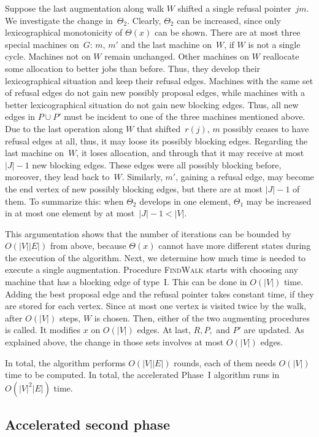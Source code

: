 \documentclass{llncs}
\begin{document}
Suppose the last augmentation along walk $W$ shifted a single refusal pointer~$jm$. We investigate the change in~$\Theta_2$. Clearly, $\Theta_2$ can be increased, since only lexicographical monotonicity of $\Theta(x)$ can be shown. There are at most three special machines on~$G$: $m$, $m'$ and the last machine on~$W$, if $W$ is not a single cycle. Machines not on $W$ remain unchanged. Other machines on $W$ reallocate some allocation to better jobs than before. Thus, they develop their lexicographical situation and keep their refusal edges. Machines with the same set of refusal edges do not gain new possibly proposal edges, while machines with a better lexicographical situation do not gain new blocking edges. Thus, all new edges in $P \cup P'$ must be incident to one of the three machines mentioned above. Due to the last operation along $W$ that shifted~$r(j)$, $m$ possibly ceases to have refusal edges at all, thus, it may loose its possibly blocking edges. Regarding the last machine on~$W$, it loses allocation, and through that it may receive at most $|J|-1$ new blocking edges. These edges were all possibly blocking before, moreover, they lead back to~$W$. Similarly, $m'$, gaining a refusal edge, may become the end vertex of new possibly blocking edges, but there are at most $|J|-1$ of them. To summarize this: when $\Theta_2$ develops in one element, $\Theta_1$ may be increased in at most one element by at most~$|J|-1 < |V|$.

This argumentation shows that the number of iterations can be bounded by $O(|V||E|)$ from above, because $\Theta(x)$ cannot have more different states during the execution of the algorithm. Next, we determine how much time is needed to execute a single augmentation. Procedure \textsc{FindWalk} starts with choosing any machine that has a blocking edge of type~I. This can be done in $O(|V|)$ time. Adding the best proposal edge and the refusal pointer takes constant time, if they are stored for each vertex. Since at most one vertex is visited twice by the walk, after $O(|V|)$ steps, $W$ is chosen. Then, either of the two augmenting procedures is called. It modifies $x$ on $O(|V|)$ edges. At last, $R, P,$ and $P'$ are updated. As explained above, the change in those sets involves at most $O(|V|)$ edges.

In total, the algorithm performs $O(|V||E|)$ rounds, each of them needs $O(|V|)$ time to be computed. In total, the accelerated Phase~I algorithm runs in $O(|V|^2|E|)$ time.

\subsection*{Accelerated second phase}
\end{document}
